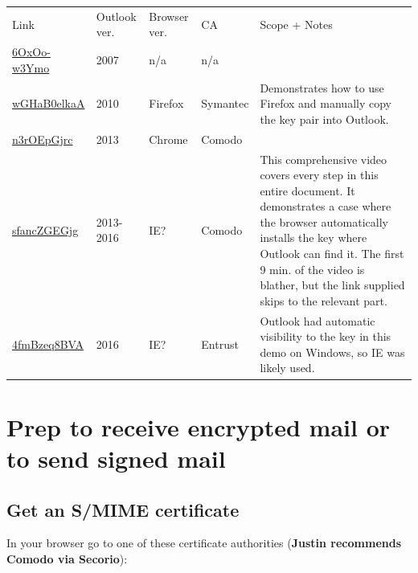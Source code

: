 \documentclass[pdftex,12pt,titlepage=false]{scrartcl}
\begin{document}
\begin{tabular}{llllp{}}
  Link & Outlook ver. & Browser ver. & CA & Scope + Notes\\
  \href{https://www.youtube.com/watch?v=6OxOo-w3Ymo}{6OxOo-w3Ymo}
  & 2007 & n/a & n/a &\\
  \href{https://www.youtube.com/watch?v=wGHaB0elkaA}{wGHaB0elkaA}
  & 2010 & Firefox & Symantec & Demonstrates how to use Firefox and manually copy the key pair into Outlook.\\
  \href{https://www.youtube.com/watch?v=n3rOEpGjrc}{n3rOEpGjrc}
  & 2013 & Chrome & Comodo & \\
  \href{https://www.youtube.com/watch?v=sfancZGEGjg\&start=535}{sfancZGEGjg}
  & 2013-2016 & IE? & Comodo & This comprehensive video covers every step in this entire document.  It demonstrates a case where the browser automatically installs the key where Outlook can find it.  The first 9 min. of the video is blather, but the link supplied skips to the relevant part.\\
  \href{https://www.youtube.com/watch?v=4fmBzeq8BVA}{4fmBzeq8BVA}
  & 2016 & IE? & Entrust & Outlook had automatic visibility to the key in this demo on Windows, so IE was likely used.\\
\end{tabular}

\section{Prep to receive encrypted mail or to send signed mail}

\subsection{Get an S/MIME certificate}\label{catable}
In your browser go to one of these certificate authorities (\textbf{Justin recommends Comodo via Secorio}):\\
\end{document}
